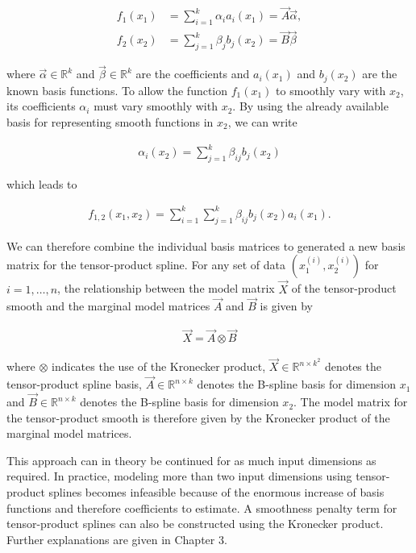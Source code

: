 \documentclass[10pt,a4paper]{report}
\begin{document}
\begin{align}
	f_1(x_1) &= \sum_{i=1}^{k} \alpha_i a_i(x_1) = \vec{A} \vec{\alpha}, \\
	f_2(x_2) &= \sum_{j=1}^{k} \beta_j b_j(x_2) = \vec{B} \vec{\beta}
\end{align}

where $\vec{\alpha} \in \mathbb{R}^{k}$ and $\vec{\beta} \in \mathbb{R}^{k}$ are the coefficients and $a_i(x_1)$ and $b_j(x_2)$ are the known basis functions. To allow the function $f_1(x_1)$ to smoothly vary with $x_2$, its coefficients $\alpha_i$ must vary smoothly with $x_2$. By using the already available basis for representing smooth functions in $x_2$, we can write

\begin{align}
	\alpha_i(x_2) = \sum_{j=1}^{k} \beta_{ij} b_j(x_2)
\end{align}

which leads to

\begin{align}
	f_{1,2}(x_1, x_2) = \sum_{i=1}^{k} \sum_{j=1}^{k} \beta_{ij} b_j(x_2) a_i(x_1).
\end{align}

We can therefore combine the individual basis matrices to generated a new basis matrix for the tensor-product spline. For any set of data $(x^{(i)}_{1}, x^{(i)}_{2})$ for $i = 1, \dots, n$, the relationship between the model matrix $\vec{X}$ of the tensor-product smooth and the marginal model matrices $\vec{A}$ and $\vec{B}$ is given by 

\begin{align}
	\vec{X} = \vec{A} \otimes \vec{B}
\end{align}

where $\otimes$ indicates the use of the Kronecker product, $\vec{X} \in \mathbb{R}^{n \times k^2}$ denotes the tensor-product spline basis, $\vec{A} \in \mathbb{R}^{n \times k}$ denotes the B-spline basis for dimension $x_1$ and $\vec{B} \in \mathbb{R}^{n \times k}$ denotes the B-spline basis for dimension $x_2$. The model matrix for the tensor-product smooth is therefore given by the Kronecker product of the marginal model matrices. \cite{wood2006GAM}  

This approach can in theory be continued for as much input dimensions as required. In practice, modeling more than two input dimensions using tensor-product splines becomes infeasible because of the enormous increase of basis functions and therefore coefficients to estimate. A smoothness penalty term for tensor-product splines can also be constructed using the Kronecker product. Further explanations are given in Chapter 3.
\end{document}
